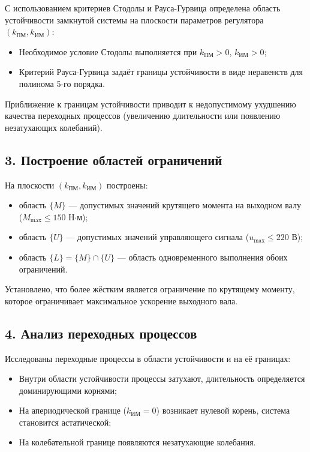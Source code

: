 \documentclass[14pt]{extreport}
\begin{document}
{С использованием критериев Стодолы и Рауса-Гурвица определена область устойчивости замкнутой системы на плоскости параметров регулятора $(k_{\text{ПМ}}, k_{\text{ИМ}})$:
\begin{itemize}
    \item Необходимое условие Стодолы выполняется при $k_{\text{ПМ}} > 0$, $k_{\text{ИМ}} > 0$;
    \item Критерий Рауса-Гурвица задаёт границы устойчивости в виде неравенств для полинома 5-го порядка.
\end{itemize}
Приближение к границам устойчивости приводит к недопустимому ухудшению качества переходных процессов (увеличению длительности или появлению незатухающих колебаний).

\subsection*{3. Построение областей ограничений}

На плоскости $(k_{\text{ПМ}}, k_{\text{ИМ}})$ построены:
\begin{itemize}
    \item область $\{M\}$ — допустимых значений крутящего момента на выходном валу ($M_{\text{max}} \leq 150$ Н$\cdot$м);
    \item область $\{U\}$ — допустимых значений управляющего сигнала ($u_{\text{max}} \leq 220$ В);
    \item область $\{L\} = \{M\} \cap \{U\}$ — область одновременного выполнения обоих ограничений.
\end{itemize}
Установлено, что более жёстким является ограничение по крутящему моменту, которое ограничивает максимальное ускорение выходного вала.

\subsection*{4. Анализ переходных процессов}

Исследованы переходные процессы в области устойчивости и на её границах:
\begin{itemize}
    \item Внутри области устойчивости процессы затухают, длительность определяется доминирующими корнями;
    \item На апериодической границе ($k_{\text{ИМ}} = 0$) возникает нулевой корень, система становится астатической;
    \item На колебательной границе появляются незатухающие колебания.
\end{itemize}

}
\end{document}
